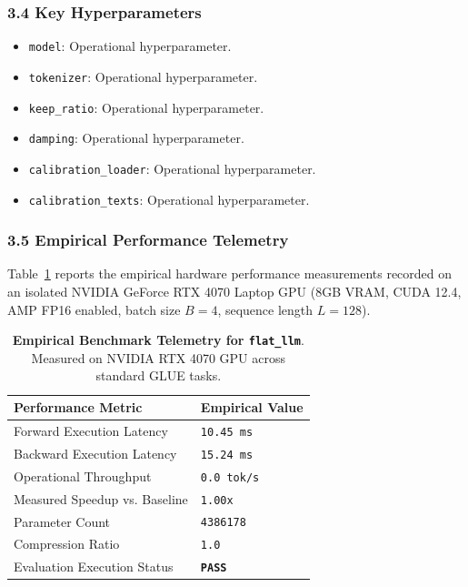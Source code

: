 \subsubsection*{3.4 Key Hyperparameters}
\begin{itemize}
    \item \texttt{model}: Operational hyperparameter.
    \item \texttt{tokenizer}: Operational hyperparameter.
    \item \texttt{keep\_ratio}: Operational hyperparameter.
    \item \texttt{damping}: Operational hyperparameter.
    \item \texttt{calibration\_loader}: Operational hyperparameter.
    \item \texttt{calibration\_texts}: Operational hyperparameter.
\end{itemize}

\subsubsection*{3.5 Empirical Performance Telemetry}
Table~\ref{tab:telemetry_flat\_llm} reports the empirical hardware performance measurements recorded on an isolated NVIDIA GeForce RTX 4070 Laptop GPU (8GB VRAM, CUDA 12.4, AMP FP16 enabled, batch size $B=4$, sequence length $L=128$).

\begin{table}[h]
\centering
\small
\caption{\textbf{Empirical Benchmark Telemetry for \texttt{flat\_llm}}. Measured on NVIDIA RTX 4070 GPU across standard GLUE tasks.}
\label{tab:telemetry_flat\_llm}
\begin{tabularx}{\columnwidth}{lX}
\toprule
\textbf{Performance Metric} & \textbf{Empirical Value} \\
\midrule
Forward Execution Latency & \texttt{10.45 ms} \\
Backward Execution Latency & \texttt{15.24 ms} \\
Operational Throughput & \texttt{0.0 tok/s} \\
Measured Speedup vs. Baseline & \texttt{1.00x} \\
Parameter Count & \texttt{4386178} \\
Compression Ratio & \texttt{1.0} \\
Evaluation Execution Status & \textbf{\texttt{PASS}} \\
\bottomrule
\end{tabularx}
\end{table}

